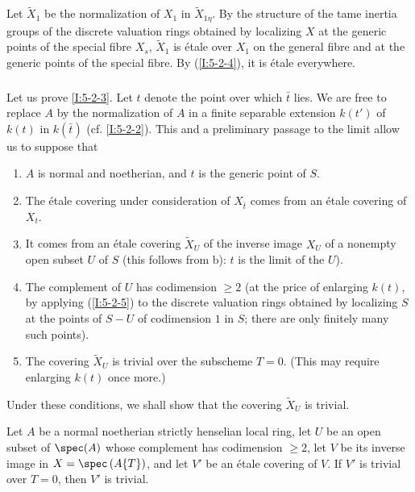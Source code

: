 Let $\widetilde X_1$ be the normalization of $X_1$ in
$\widetilde X_{1\eta}$. By the structure of the tame inertia groups of
the discrete valuation rings obtained by localizing $X$ at the generic
points of the special fibre $X_s$, $\widetilde X_1$ is étale over $X_1$
on the general fibre and at the generic points of the special fibre. By
(\ref{I:5-2-4}), it is étale everywhere.

\subsubsection{}\label{I:5-2-6} %

Let us prove \ref{I:5-2-3}. Let $t$ denote the point over which $\bar t$ lies. We are free to replace
$A$ by the normalization of $A$ in a finite separable extension $k(t')$ of
$k(t)$ in $k(\bar t)$ (cf. \ref{I:5-2-2}). This and a preliminary
passage to the limit allow us to suppose that
\begin{enumerate}[\indent a)]
  \item $A$ is normal and noetherian, and $t$ is the generic point of $S$.
  \item The étale covering under consideration of $X_{\bar t}$ comes from
    an étale covering of $X_t$.
  \item It comes from an étale covering $\widetilde X_U$ of the inverse
    image $X_U$ of a nonempty open subset $U$ of $S$ (this follows from
    b): $t$ is the limit of the $U$).
  \item The complement of $U$ has codimension $\geqslant2$ (at the price
    of enlarging $k(t)$, by applying (\ref{I:5-2-5}) to the discrete
    valuation rings obtained by localizing $S$ at the points of
    $S- U$ of codimension $1$ in $S$; there are only finitely many
    such points).
  \item The covering $\widetilde X_U$ is trivial over the subscheme $T=0$.
    (This may require enlarging $k(t)$ once more.)
\end{enumerate}

Under these conditions, we shall show that the covering
$\widetilde X_U$ is trivial.

\begin{lemma}\label{I:5-2-7} %
Let $A$ be a normal noetherian strictly henselian local ring, let $U$
be an open subset of $\spec(A)$ whose complement has codimension
$\geqslant2$, let $V$ be its inverse image in
$X=\spec\left(A\{T\}\right)$, and let $V'$ be an étale covering of
$V$. If $V'$ is trivial over $T=0$, then $V'$ is trivial.
\end{lemma}

